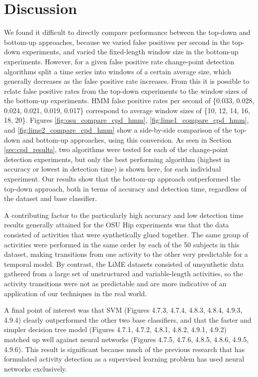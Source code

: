 \newpage

\section{Discussion}

We found it difficult to directly compare performance between the
top-down and bottom-up approaches, because we
varied false positives per second in the top-down experiments,
and varied the fixed-length window size in the bottom-up experiments.
However, for a given false positive rate change-point
detection algorithms split a time series into windows of a certain average size,
which generally decreases as the false positive rate increases. From this it is possible
to relate false positive rates from the top-down experiments to
the window sizes of the bottom-up experiments. HMM false positive rates per second of
\{0.033, 0.028, 0.024, 0.021, 0.019, 0.017\} correspond to average
window sizes of \{10, 12, 14, 16, 18, 20\}. Figures \ref{fig:osu_compare_cpd_hmm},
\ref{fig:lime1_compare_cpd_hmm}, and \ref{fig:lime2_compare_cpd_hmm}
show a side-by-side comparison of the top-down and bottom-up approaches, using
this conversion. As seen in Section \ref{sec:cpd_results}, two algorithms 
were tested for each of the change-point detection experiments, but only the
best performing algorithm (highest in accuracy or lowest in detection time) is 
shown here, for each individual experiment.
Our results show that the bottom-up approach outperformed the top-down
approach, both in terms of accuracy
and detection time, regardless of the dataset and base classifier.

A contributing factor to the particularly high accuracy and low detection time
results generally attained for the OSU Hip experiments was that the data
consisted of activities that were synthetically glued together. The same group
of activities were performed in the same order by each of the 50 subjects in
this dataset, making transitions from one activity to the other very predictable
for a temporal model. By contrast, the LiME datasets consisted of unsynthetic
data gathered from a large set of unstructured and variable-length activities,
so the activity transitions were not as predictable and are more indicative of
an application of our techniques in the real world.

A final point of interest was that SVM (Figures 4.7.3, 4.7.4, 4.8.3, 4.8.4, 4.9.3, 4.9.4) clearly outperformed the other two
base classifiers, and that the faster and simpler decision tree model (Figures 4.7.1, 4.7.2, 4.8.1, 4.8.2, 4.9.1, 4.9.2) matched up
well against neural networks (Figures 4.7.5, 4.7.6, 4.8.5, 4.8.6, 4.9.5, 4.9.6). This result is significant because much of the
previous research that has formulated activity detection as a supervised learning
problem has used neural networks exclusively.

